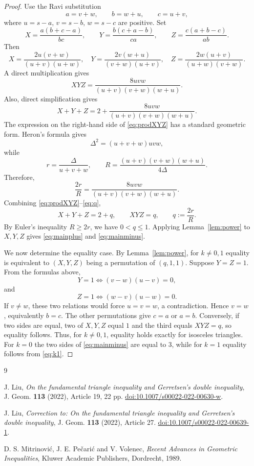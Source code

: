\documentclass[11pt]{amsart}
\theoremstyle{remark}
\begin{document}
\begin{proof}
Use the Ravi substitution
\[
 a=v+w,\qquad b=w+u,\qquad c=u+v,
\]
where $u=s-a$, $v=s-b$, $w=s-c$ are positive. Set
\[
 X=\frac{a(b+c-a)}{bc},\qquad
 Y=\frac{b(c+a-b)}{ca},\qquad
 Z=\frac{c(a+b-c)}{ab}.
\]
Then
\[
 X=\frac{2u(v+w)}{(u+v)(u+w)},\quad
 Y=\frac{2v(w+u)}{(v+w)(u+v)},\quad
 Z=\frac{2w(u+v)}{(u+w)(v+w)}.
\]
A direct multiplication gives
\begin{equation}\label{eq:prodXYZ}
 XYZ=\frac{8uvw}{(u+v)(v+w)(w+u)}.
\end{equation}
Also, direct simplification gives
\begin{equation}\label{eq:sumXYZ}
 X+Y+Z=2+\frac{8uvw}{(u+v)(v+w)(w+u)}.
\end{equation}
The expression on the right-hand side of \eqref{eq:prodXYZ} has a standard geometric form. Heron's formula gives
\[
 \Delta^2=(u+v+w)uvw,
\]
while
\[
 r=\frac{\Delta}{u+v+w},\qquad
 R=\frac{(u+v)(v+w)(w+u)}{4\Delta}.
\]
Therefore,
\begin{equation}\label{eq:q}
 \frac{2r}{R}=\frac{8uvw}{(u+v)(v+w)(w+u)}.
\end{equation}
Combining \eqref{eq:prodXYZ}--\eqref{eq:q},
\[
 X+Y+Z=2+q,\qquad XYZ=q,
 \qquad q:=\frac{2r}{R}.
\]
By Euler's inequality $R\ge2r$, we have $0<q\le1$. Applying Lemma~\ref{lem:power} to $X,Y,Z$ gives \eqref{eq:mainplus} and \eqref{eq:mainminus}.

We now determine the equality case. By Lemma~\ref{lem:power}, for
$k\ne0,1$ equality is equivalent to $(X,Y,Z)$ being a permutation of
$(q,1,1)$. Suppose $Y=Z=1$. From the formulas above,
\[
 Y=1\iff (v-w)(u-v)=0,
\]
and
\[
 Z=1\iff (w-v)(u-w)=0.
\]
If $v\ne w$, these two relations would force $u=v=w$, a contradiction. Hence $v=w$, equivalently $b=c$. The other permutations give $c=a$ or $a=b$. Conversely, if two sides are equal, two of $X,Y,Z$ equal $1$ and the third equals $XYZ=q$, so equality follows. Thus, for $k\ne0,1$, equality holds exactly for isosceles triangles.
For $k=0$ the two sides of \eqref{eq:mainminus} are equal to $3$, while
for $k=1$ equality follows from \eqref{eq:k1}.
\end{proof}

\begin{thebibliography}{9}

J. Liu,
\emph{On the fundamental triangle inequality and Gerretsen's double inequality},
J. Geom. \textbf{113} (2022), Article 19, 22 pp.
\href{https://doi.org/10.1007/s00022-022-00630-w}{doi:10.1007/s00022-022-00630-w}.

J. Liu,
\emph{Correction to: On the fundamental triangle inequality and Gerretsen's double inequality},
J. Geom. \textbf{113} (2022), Article 27.
\href{https://doi.org/10.1007/s00022-022-00639-1}{doi:10.1007/s00022-022-00639-1}.

D. S. Mitrinovi\'c, J. E. Pe\v{c}ari\'c and V. Volenec,
\emph{Recent Advances in Geometric Inequalities},
Kluwer Academic Publishers, Dordrecht, 1989.

\end{thebibliography}
\end{document}
